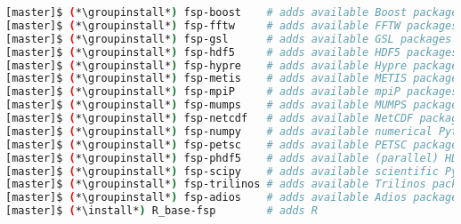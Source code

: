 \begin{lstlisting}[language=bash,keywords={},upquote=true,keepspaces]
[master]$ (*\groupinstall*) fsp-boost    # adds available Boost packages
[master]$ (*\groupinstall*) fsp-fftw     # adds available FFTW packages
[master]$ (*\groupinstall*) fsp-gsl      # adds available GSL packages
[master]$ (*\groupinstall*) fsp-hdf5     # adds available HDF5 packages
[master]$ (*\groupinstall*) fsp-hypre    # adds available Hypre packages
[master]$ (*\groupinstall*) fsp-metis    # adds available METIS packages
[master]$ (*\groupinstall*) fsp-mpiP     # adds available mpiP packages
[master]$ (*\groupinstall*) fsp-mumps    # adds available MUMPS packages
[master]$ (*\groupinstall*) fsp-netcdf   # adds available NetCDF packages
[master]$ (*\groupinstall*) fsp-numpy    # adds available numerical Python packages
[master]$ (*\groupinstall*) fsp-petsc    # adds available PETSC packages
[master]$ (*\groupinstall*) fsp-phdf5    # adds available (parallel) HDF5 packages
[master]$ (*\groupinstall*) fsp-scipy    # adds available scientific Python packages
[master]$ (*\groupinstall*) fsp-trilinos # adds available Trilinos packages
[master]$ (*\groupinstall*) fsp-adios    # adds available Adios packages
[master]$ (*\install*) R_base-fsp        # adds R
\end{lstlisting}
